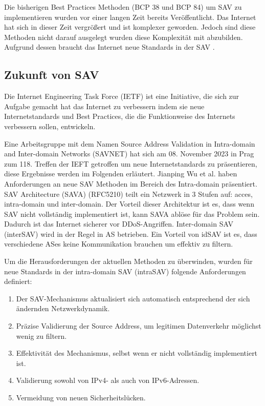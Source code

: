 \documentclass[sigplan,screen]{acmart}
\begin{document}
Die bisherigen Best Practices Methoden (BCP 38 und BCP 84) um SAV zu implementieren  wurden vor einer langen Zeit bereits Veröffentlicht. Das Internet hat sich in dieser Zeit vergrößert und ist komplexer geworden. Jedoch sind diese Methoden nicht darauf ausgelegt wurden diese Komplexität mit abzubilden.  Aufgrund dessen braucht das Internet neue Standards in der SAV \cite{SAV_requirements01}.

\subsection{Zukunft von SAV}

Die Internet Engineering Task Force (IETF) ist eine Initiative, die sich zur Aufgabe gemacht hat das Internet zu verbessern indem sie neue Internetstandards und Best Practices, die die Funktionweise des Internets verbessern sollen, entwickeln.

Eine Arbeitsgruppe mit dem Namen Source Address Validation in Intra-domain and Inter-domain Networks (SAVNET) hat sich am 08. November 2023 in Prag zum 118. Treffen der IEFT getroffen um neue Internetstandards zu präsentieren, diese Ergebnisse werden im Folgenden erläutert. 
Jianping Wu et al. \cite{SAV_requirements01} haben Anforderungen an neue SAV Methoden im Bereich des Intra-domain präsentiert. SAV Architecture (SAVA) (RFC5210) teilt ein Netzwerk in 3 Stufen auf: acces, intra-domain und inter-domain. Der Vorteil dieser Architektur ist es, dass wenn SAV nicht vollständig implementiert ist, kann SAVA ablöse für das Problem sein. Dadurch ist das Internet sicherer vor DDoS-Angriffen. Inter-domain SAV (interSAV) wird in der Regel in AS betrieben. Ein Vorteil von idSAV ist es, dass verschiedene ASes keine Kommunikation brauchen um effektiv zu filtern.

Um die Herausforderungen der aktuellen Methoden zu überwinden, wurden für neue Standards in der intra-domain SAV (intraSAV)  folgende Anforderungen definiert:

\begin{enumerate}
\item Der SAV-Mechanismus aktualisiert sich automatisch entsprechend der sich ändernden Netzwerkdynamik.
\item Präzise Validierung der Source Address, um legitimen Datenverkehr möglichst wenig zu filtern.
\item Effektivität des Mechanismus, selbst wenn er nicht vollständig implementiert ist.
\item Validierung sowohl von IPv4- als auch von IPv6-Adressen.
\item Vermeidung von neuen Sicherheitslücken.
\end{enumerate}
\end{document}

